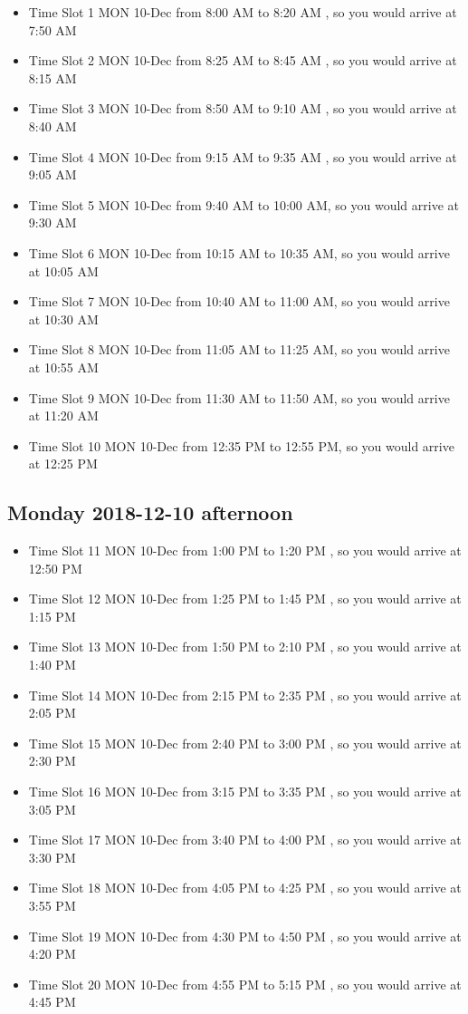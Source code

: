 \documentclass[]{book}
\providecommand{\tightlist}{%
  \setlength{\itemsep}{0pt}\setlength{\parskip}{0pt}}
\theoremstyle{definition}
\theoremstyle{definition}
\theoremstyle{definition}
\theoremstyle{remark}
\begin{document}
\begin{itemize}
\tightlist
\item
  Time Slot 1 MON 10-Dec from 8:00 AM to 8:20 AM , so you would arrive
  at 7:50 AM
\item
  Time Slot 2 MON 10-Dec from 8:25 AM to 8:45 AM , so you would arrive
  at 8:15 AM
\item
  Time Slot 3 MON 10-Dec from 8:50 AM to 9:10 AM , so you would arrive
  at 8:40 AM
\item
  Time Slot 4 MON 10-Dec from 9:15 AM to 9:35 AM , so you would arrive
  at 9:05 AM
\item
  Time Slot 5 MON 10-Dec from 9:40 AM to 10:00 AM, so you would arrive
  at 9:30 AM
\item
  Time Slot 6 MON 10-Dec from 10:15 AM to 10:35 AM, so you would arrive
  at 10:05 AM
\item
  Time Slot 7 MON 10-Dec from 10:40 AM to 11:00 AM, so you would arrive
  at 10:30 AM
\item
  Time Slot 8 MON 10-Dec from 11:05 AM to 11:25 AM, so you would arrive
  at 10:55 AM
\item
  Time Slot 9 MON 10-Dec from 11:30 AM to 11:50 AM, so you would arrive
  at 11:20 AM
\item
  Time Slot 10 MON 10-Dec from 12:35 PM to 12:55 PM, so you would arrive
  at 12:25 PM
\end{itemize}

\hypertarget{monday-2018-12-10-afternoon}{%
\subsection{Monday 2018-12-10
afternoon}\label{monday-2018-12-10-afternoon}}

\begin{itemize}
\tightlist
\item
  Time Slot 11 MON 10-Dec from 1:00 PM to 1:20 PM , so you would arrive
  at 12:50 PM
\item
  Time Slot 12 MON 10-Dec from 1:25 PM to 1:45 PM , so you would arrive
  at 1:15 PM
\item
  Time Slot 13 MON 10-Dec from 1:50 PM to 2:10 PM , so you would arrive
  at 1:40 PM
\item
  Time Slot 14 MON 10-Dec from 2:15 PM to 2:35 PM , so you would arrive
  at 2:05 PM
\item
  Time Slot 15 MON 10-Dec from 2:40 PM to 3:00 PM , so you would arrive
  at 2:30 PM
\item
  Time Slot 16 MON 10-Dec from 3:15 PM to 3:35 PM , so you would arrive
  at 3:05 PM
\item
  Time Slot 17 MON 10-Dec from 3:40 PM to 4:00 PM , so you would arrive
  at 3:30 PM
\item
  Time Slot 18 MON 10-Dec from 4:05 PM to 4:25 PM , so you would arrive
  at 3:55 PM
\item
  Time Slot 19 MON 10-Dec from 4:30 PM to 4:50 PM , so you would arrive
  at 4:20 PM
\item
  Time Slot 20 MON 10-Dec from 4:55 PM to 5:15 PM , so you would arrive
  at 4:45 PM
\end{itemize}
\end{document}
